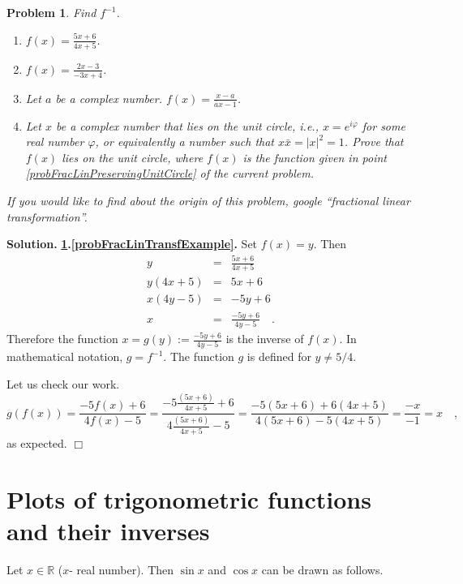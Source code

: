 \documentclass[12pt]{book}
\newenvironment{solution}{\medskip\noindent\textbf{Solution.} }{$\Box$}
\newtheorem{problem}[theorem]{Problem}
\begin{document}
\begin{problem}\label{probFracLin}
Find $f^{-1}$.
\begin{enumerate}
\item \label{probFracLinTransfExample}  $f(x)= \frac{5x+6}{4x+5}$.
\item  $f(x)= \frac{2x-3}{-3x+4}$.
\item \label{probFracLinPreservingUnitCircle} Let $a$ be a complex number. $\displaystyle f(x)=\frac{x-a}{\bar a x-1}$.
\item  Let $x$ be a complex number that lies on the unit circle, i.e., $x=e^{i\varphi}$ for some real number $\varphi$, or equivalently a number such that $ x \bar x = |x|^2 =1$. Prove that $f(x)$ lies on the unit circle, where $f(x)$ is the function given in point \ref{probFracLinPreservingUnitCircle} of the current problem.
\end{enumerate}
If you would like to find about the origin of this problem, google ``fractional linear transformation''.
\end{problem}
\begin{solution}
\textbf{\ref{probFracLin}.\ref{probFracLinTransfExample}.} Set $f(x)=y$. Then
\[
\begin{array}{rcl}
y&=&\displaystyle \frac{5x+6}{4x+5}\\
y(4x+5)&=&5x+6\\
x(4y-5)&=&-5y+6\\
x&=&\displaystyle \frac{-5y+6}{4y-5}\quad .
\end{array}
\]
Therefore the function $x=g(y):=\frac{-5y+6}{4y-5}$ is the inverse of $f(x)$. In mathematical notation, $g=f^{-1}$. The function $g$ is defined for $y\neq 5/4$.

Let us check our work.
\[
g(f(x))=  \frac{-5f(x) +6}{4f(x)-5}=  \frac{-5\frac{(5x+6)}{4x+5} +6}{4\frac{(5x+6)}{4x+5}-5}= \frac{-5(5x+6) +6(4x+5)}{4(5x+6)-5(4x+5)}=\frac{-x}{-1}=x\quad ,
\]
as expected.
\end{solution}
\section{Plots of trigonometric functions and their inverses}\label{secGraphsTrigFunc}
Let $x\in \mathbb R$ ($x$- real number). Then $\sin x$ and $\cos x$ can be drawn as follows.
\end{document}

